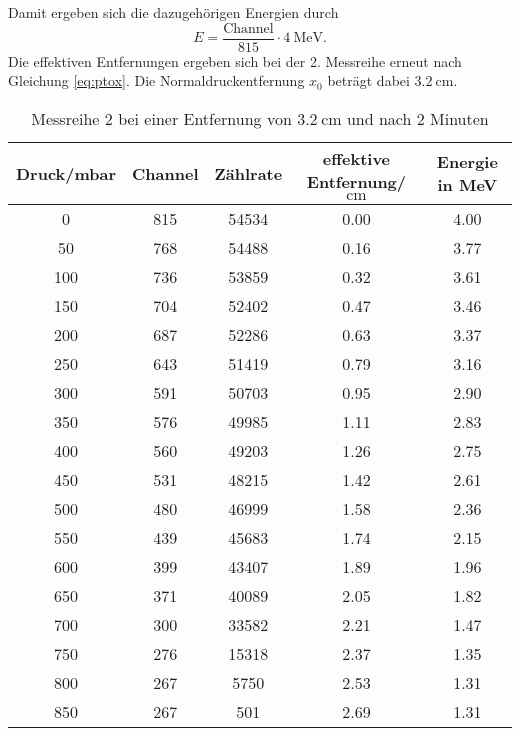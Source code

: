 Damit ergeben sich die dazugehörigen Energien durch
\begin{equation}
  E=\frac{\text{Channel}}{815}\cdot \qty{4}{\mega\electronvolt}.
  \label{eq:En2}
\end{equation} 
Die effektiven Entfernungen ergeben sich bei der 2. Messreihe erneut nach Gleichung \eqref{eq:ptox}.
Die Normaldruckentfernung $x_0$ beträgt dabei $\qty{3.2}{\centi\meter}$.
\begin{table}[H]
  \centering
  \caption{Messreihe 2 bei einer Entfernung von $\qty{3.2}{\centi\meter}$ und nach 2 Minuten}
  \label{tab:Mess2}
  \begin{tabular}{S[table-format=4] S[table-format=3] S[table-format=5] S[table-format=1.2] S[table-format=1.2]}
    \toprule
      {Druck/mbar} & {Channel} & {Zählrate}&{effektive Entfernung/$\unit{\centi\meter}$} &{Energie in MeV}\\
     & 815 & 54534 & 0.00 & 4.00 \\
      50 & 768 & 54488 & 0.16 & 3.77 \\
      100 & 736 & 53859 & 0.32 & 3.61 \\
      150 & 704 & 52402 & 0.47 & 3.46 \\
      200 & 687 & 52286 & 0.63 & 3.37 \\
      250 & 643 & 51419 & 0.79 & 3.16 \\
      300 & 591 & 50703 & 0.95 & 2.90 \\
      350 & 576 & 49985 & 1.11 & 2.83 \\
      400 & 560 & 49203 & 1.26 & 2.75 \\
      450 & 531 & 48215 & 1.42 & 2.61 \\
      500 & 480 & 46999 & 1.58 & 2.36 \\
      550 & 439 & 45683 & 1.74 & 2.15 \\
      600 & 399 & 43407 & 1.89 & 1.96 \\
      650 & 371 & 40089 & 2.05 & 1.82 \\
      700 & 300 & 33582 & 2.21 & 1.47 \\
      750 & 276 & 15318 & 2.37 & 1.35 \\
      800 & 267 & 5750 & 2.53 & 1.31 \\
      850 & 267 & 501 & 2.69 & 1.31 \\
      \bottomrule
  \end{tabular}
\end{table}
